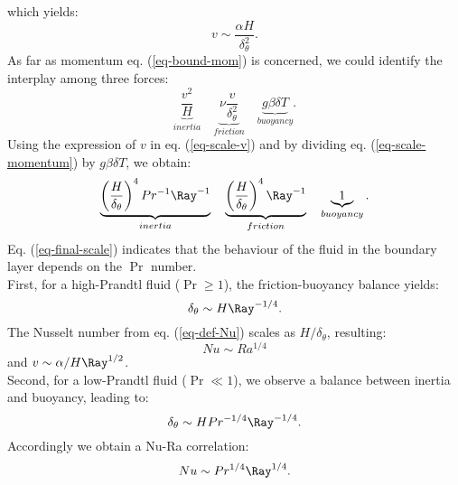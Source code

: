 which yields:
\begin{equation} \label{eq-scale-v}
	v \sim \frac{\alpha H}{\delta_\theta^2}.
\end{equation}
As far as momentum eq. (\ref{eq-bound-mom}) is concerned, we could identify the interplay among three forces:
\begin{equation} \label{eq-scale-momentum}
	\underbrace{\frac{v^2}{H}}_{inertia} \quad \underbrace{\nu \frac{v}{\delta_\theta^2}}_{friction} \quad \underbrace{g \beta \delta T}_{buoyancy}.
\end{equation}
Using the expression of $v$ in eq. (\ref{eq-scale-v}) and by dividing eq. (\ref{eq-scale-momentum}) by $g \beta \delta T$, we obtain:
\begin{equation} \label{eq-final-scale}
	\underbrace{\left( \frac{H}{\delta_\theta} \right)^4 Pr ^{-1} \Ray^{-1}}_{inertia} \quad  \underbrace{\left( \frac{H}{\delta_\theta} \right)^4 \Ray^{-1}}_{friction} \quad \underbrace{1}_{buoyancy}.
\end{equation}
Eq. (\ref{eq-final-scale}) indicates that the behaviour of the fluid in the boundary layer depends on the $\Pr$ number. \\
First, for a high-Prandtl fluid ($\Pr \geq 1$), the friction-buoyancy balance yields: 
\begin{equation} \label{eq-scale-nbd-high-Pr}
	\delta_\theta \sim H \Ray^{-1/4}.
\end{equation}
The Nusselt number from eq. (\ref{eq-def-Nu}) scales as $H/\delta_\theta$, resulting: 
\begin{equation}
	N\!u \sim Ra^{1/4}
\end{equation}
and $v \sim \alpha/H \Ray^{1/2}$. \\
Second, for a low-Prandtl fluid ($\Pr \ll 1$), we observe a balance between inertia and buoyancy, leading to:
\begin{equation} \label{eq-corr-Low-Pr}
	\delta_\theta \sim H Pr^{-1/4} \Ray^{-1/4}.
\end{equation}
Accordingly we obtain a Nu-Ra correlation:
\begin{equation}
	Nu \sim Pr^{1/4} \Ray^{1/4}.
\end{equation}




%
%
%

